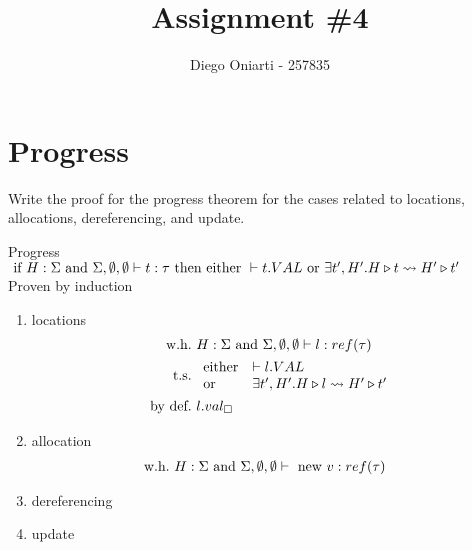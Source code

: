 \documentclass{article}
\title{Assignment \#4}
\author{Diego Oniarti - 257835}
\date{}
\begin{document}
\maketitle

\section{Progress}
Write the proof for the progress theorem for the cases related to locations, allocations, dereferencing, and update.
\begin{esempio}{Progress}
    $\text{ if } H:\Sigma\text{ and }\Sigma,\emptyset,\emptyset\vdash  t:\tau \text{ then } \text{either } \vdash t.VAL \text{ or } \exists t',H'.H\triangleright t \leadsto H'\triangleright t'$ \\
    Proven by induction
\end{esempio}
\begin{enumerate}
    \item locations
        \begin{align*}
            \text{w.h.} &\ H:\Sigma \AND \Sigma,\emptyset,\emptyset\vdash l:ref(\tau) \\
            \text{t.s.} &\ 
            \begin{array}{ll}
                \text{either}  & \vdash l.VAL \\
                \text{or}  & \exists t',H'. H\triangleright l \leadsto H'\triangleright t'
            \end{array} \\
            \text{by def.} &\ l.val_\square
        \end{align*}
    \item allocation
        \begin{align*}
            \text{w.h.} &\ H:\Sigma\text{ and } \Sigma,\emptyset,\emptyset\vdash \text{ new } v: ref(\tau)
        \end{align*}
    \item dereferencing
    \item update
\end{enumerate}
\end{document}

